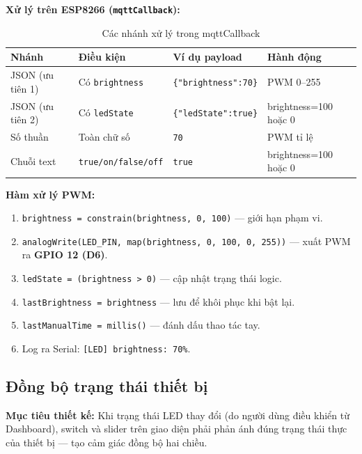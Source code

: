 \documentclass[13pt,a4paper]{article}
\newcommand{\code}[1]{\texttt{#1}}
\begin{document}
\textbf{Xử lý trên ESP8266 (\code{mqttCallback}):}

\begin{table}[htbp]
    \centering
    \caption{Các nhánh xử lý trong mqttCallback}
    \label{tbl:callback}
    \begin{tabular}{|L{2.5cm}|C{4cm}|C{3.5cm}|C{3cm}|}
        \hline
        \textbf{Nhánh} & \textbf{Điều kiện} & \textbf{Ví dụ payload} & \textbf{Hành động} \\
        \hline
        JSON (ưu tiên 1) & Có \code{brightness} & \code{\{"brightness":70\}} & PWM 0--255 \\
        \hline
        JSON (ưu tiên 2) & Có \code{ledState} & \code{\{"ledState":true\}} & brightness=100 hoặc 0 \\
        \hline
        Số thuần & Toàn chữ số & \code{70} & PWM tỉ lệ \\
        \hline
        Chuỗi text & \code{true/on/false/off} & \code{true} & brightness=100 hoặc 0 \\
        \hline
    \end{tabular}
\end{table}

\textbf{Hàm xử lý PWM:}

\begin{enumerate}[label=\arabic*., leftmargin=1.5cm]
    \item \code{brightness = constrain(brightness, 0, 100)} --- giới hạn phạm vi.
    \item \code{analogWrite(LED\_PIN, map(brightness, 0, 100, 0, 255))} --- xuất PWM ra \textbf{GPIO 12 (D6)}.
    \item \code{ledState = (brightness > 0)} --- cập nhật trạng thái logic.
    \item \code{lastBrightness = brightness} --- lưu để khôi phục khi bật lại.
    \item \code{lastManualTime = millis()} --- đánh dấu thao tác tay.
    \item Log ra Serial: \code{[LED] brightness: 70\%}.
\end{enumerate}

\subsection{Đồng bộ trạng thái thiết bị}
\label{sec:dongbo}

\textbf{Mục tiêu thiết kế:} Khi trạng thái LED thay đổi (do người dùng điều khiển từ Dashboard), switch và slider trên giao diện phải phản ánh đúng trạng thái thực của thiết bị --- tạo cảm giác đồng bộ hai chiều.
\end{document}
